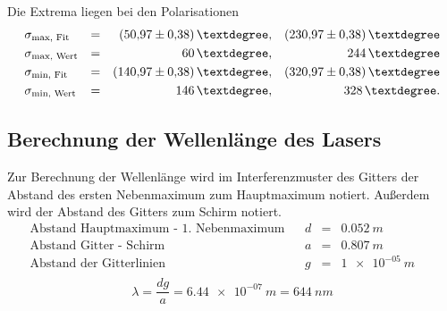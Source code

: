 %
Die Extrema liegen bei den Polarisationen
\begin{align*}
  &\sigma_{\text{max, Fit}} &=&& \SI{50.97 \pm 0.38}{°},   && \SI{230.97 \pm 0.38}{°} \\
  &\sigma_{\text{max, Wert}} &=&& \SI{ 60 }{°},                          && \SI{ 244 }{°} \\
  &\sigma_{\text{min, Fit}} &=&& \SI{140.97 \pm 0.38}{°},  && \SI{320.97 \pm 0.38}{°} \\
  &\sigma_{\text{min, Wert}} &=&& \SI{ 146 }{°},                         && \SI{ 328 }{°}. \\
\end{align*}
\FloatBarrier

\subsection{Berechnung der Wellenlänge des Lasers}
Zur Berechnung der Wellenlänge wird im Interferenzmuster des Gitters der Abstand des ersten Nebenmaximum zum Hauptmaximum notiert.
Außerdem wird der Abstand des Gitters zum Schirm notiert.
\begin{align*}
\text{Abstand Hauptmaximum - 1. Nebenmaximum}      && d &=&\SI{0.052}{m} && \\
\text{Abstand Gitter - Schirm}                     && a &=&\SI{0.807}{m} && \\
\text{Abstand der Gitterlinien}                    && g &=&\SI{1e-05}{m} && \\
\end{align*}
\begin{equation*}
    \lambda = \frac{d g}{a} = \SI{6.44e-07}{m}= \SI{644}{nm}
\end{equation*}
